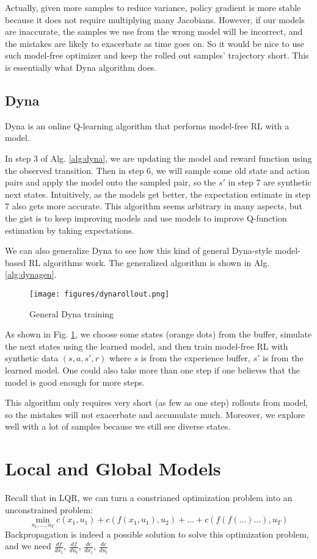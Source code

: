 Actually, given more samples to reduce variance, policy gradient is more stable because it does not require multiplying many Jacobians. However, if our models are inaccurate, the samples we use from the wrong model will be incorrect, and the mistakes are likely to exacerbate as time goes on. So it would be nice to use such model-free optimizer and keep the rolled out samples' trajectory short. This is essentially what Dyna algorithm does.

\subsection{Dyna}
Dyna is an online Q-learning algorithm that performs model-free RL with a model. 

In step 3 of Alg. \ref{alg:dyna}, we are updating the model and reward function using the observed transition. Then in step 6, we will sample some old state and action pairs and apply the model onto the sampled pair, so the $s'$ in step 7 are synthetic next states. Intuitively, as the models get better, the expectation estimate in step 7 also gets more accurate. This algorithm seems arbitrary in many aspects, but the gist is to keep improving models and use models to improve Q-function estimation by taking expectations. 

We can also generalize Dyna to see how this kind of general Dyna-style model-based RL algorithms work. The generalized algorithm is shown in Alg. \ref{alg:dynagen}.

\begin{figure}
    \centering
    \texttt{[image: figures/dynarollout.png]}
    \caption{General Dyna training}
    \label{fig:dynarollout}
\end{figure}
As shown in Fig. \ref{fig:dynarollout}, we choose some states (orange dots) from the buffer, simulate the next states using the learned model, and then train model-free RL with synthetic data $(s,a,s',r)$ where $s$ is from the experience buffer, $s'$ is from the learned model. One could also take more than one step if one believes that the model is good enough for more steps. 

This algorithm only requires very short (as few as one step) rollouts from model, so the mistakes will not exacerbate and accumulate much. Moreover, we explore well with a lot of samples because we still see diverse states. 

\section{Local and Global Models}
Recall that in LQR, we can turn a constrianed optimization problem into an unconstrained problem:
\[
\min_{u_1,\dots,u_T}c(x_1,u_1)+c(f(x_1,u_1),u_2)+\dots+c(f(f(\dots)\dots),u_T)
\]
Backpropagation is indeed a possible solution to solve this optimization problem, and we need $\frac{df}{d{x_t}}$, $\frac{df}{du_t}$, $\frac{dc}{dx_t}$, $\frac{dc}{du_t}$

